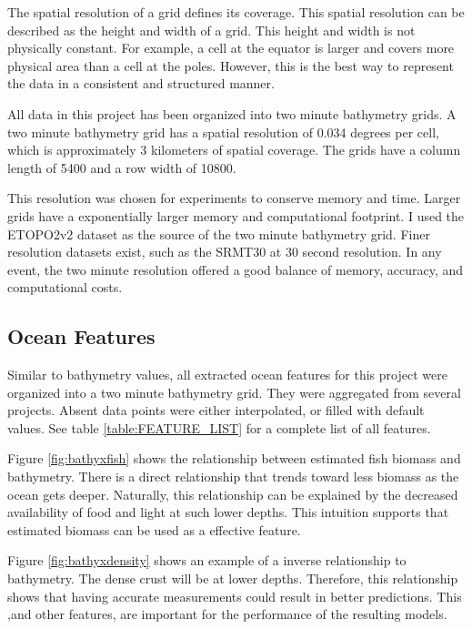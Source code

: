 \par
The spatial resolution of a grid defines its coverage.
This spatial resolution can be described as the height and width of a grid.
This height and width is not physically constant.
For example, a cell at the equator is larger and covers more physical area than a cell at the poles.
However, this is the best way to represent the data in a consistent and structured manner.

\par
All data in this project has been organized into two minute bathymetry grids.
A two minute bathymetry grid has a spatial resolution of 0.034 degrees per cell, which is approximately 3 kilometers of spatial coverage.
The grids have a column length of 5400 and a row width of 10800.

\par
This resolution was chosen for experiments to conserve memory and time.
Larger grids have a exponentially larger memory and computational footprint.
I used the \ac{ETOPO}2v2 \cite{national1988etopo} dataset as the source of the two minute bathymetry grid.
Finer resolution datasets exist, such as the SRMT30 \cite{becker2009global} at 30 second resolution.
In any event, the two minute resolution offered a good balance of memory, accuracy, and computational costs.

\subsection{Ocean Features}
Similar to bathymetry values, all extracted ocean features for this project were organized into a two minute bathymetry grid.
They were aggregated from several projects.
Absent data points were either interpolated, or filled with default values.
See table \ref{table:FEATURE_LIST} for a complete list of all features.

\par
Figure \ref{fig:bathyxfish} shows the relationship between estimated fish biomass and bathymetry.
There is a direct relationship that trends toward less biomass as the ocean gets deeper.
Naturally, this relationship can be explained by the decreased availability of food and light at such lower depths.
This intuition supports that estimated biomass can be used as a effective feature.


\par
Figure \ref{fig:bathyxdensity} shows an example of a inverse relationship to bathymetry.
The dense crust will be at lower depths.
Therefore, this relationship shows that having accurate measurements could result in better predictions.
This ,and other features, are important for the performance of the resulting models.

